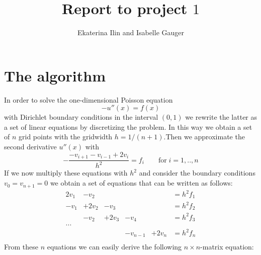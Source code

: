 \documentclass[11pt,a4wide]{article}
\begin{document}
\title{Report to project $1$}
\author{Ekaterina Ilin and Isabelle Gauger}
\maketitle
\tableofcontents
\newpage
\section{The algorithm}
In order to solve the one-dimensional Poisson equation
\begin{equation}
-u''(x)=f(x)
\label{eq:1}
\end{equation}
with Dirichlet boundary conditions in the interval $(0,1)$ we rewrite the latter as a set of linear equations by discretizing the problem. In this way we obtain a set of $n$ grid points with the gridwidth $h=1/(n+1)$.Then we approximate the second derivative $u''(x)$ with
\begin{equation}
-\dfrac{-v_{i+1}-v_{i-1}+2v_i}{h^2}=f_i\qquad \text{for}\; i=1,..,n
\label{eq:2}
\end{equation}
If we now multiply these equations with $h^2$ and consider the boundary conditions \mbox{$v_0=v_{n+1}=0$} we obtain a set of equations that can be written as follows:
\begin{equation}
 \begin{matrix}
2v_1 & - v_2 &          &               &          &=h^2f_1 \\
 -v_1 & +2v_2 & -v_3  &               &          &=h^2f_2 \\
         &  -v_2 & +2v_3 & -v_4       &          & =h^2f_3\\
...\\ 
         &           &          & -v_{n-1}& +2v_n & =h^2f_n\\
 \end{matrix}
\label{eq:2.2}
\end{equation}
From these $n$ equations we can easily derive the following $n\times n$-matrix equation:
\end{document}
